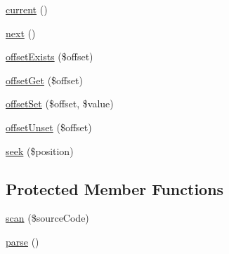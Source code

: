 \begin{DoxyCompactItemize}
\item 
\mbox{\hyperlink{class_p_h_p___token___stream_af343507d1926e6ecf964625d41db528c}{current}} ()
\item 
\mbox{\hyperlink{class_p_h_p___token___stream_acea62048bfee7b3cd80ed446c86fb78a}{next}} ()
\item 
\mbox{\hyperlink{class_p_h_p___token___stream_a24ff257ec0c2221bc6fd7b1b4388e26e}{offset\+Exists}} (\$offset)
\item 
\mbox{\hyperlink{class_p_h_p___token___stream_a59aee6e89465b48f014699f41b521f87}{offset\+Get}} (\$offset)
\item 
\mbox{\hyperlink{class_p_h_p___token___stream_ac6bde6b1eb50eb5377e91771fe46b7a3}{offset\+Set}} (\$offset, \$value)
\item 
\mbox{\hyperlink{class_p_h_p___token___stream_a2411227ea7118b13495de9839fd4b563}{offset\+Unset}} (\$offset)
\item 
\mbox{\hyperlink{class_p_h_p___token___stream_a94de197725a8af880010c507aa04ae94}{seek}} (\$position)
\end{DoxyCompactItemize}
\subsection*{Protected Member Functions}
\begin{DoxyCompactItemize}
\item 
\mbox{\hyperlink{class_p_h_p___token___stream_af7695cd79399ee0a062365e5bb77491b}{scan}} (\$source\+Code)
\item 
\mbox{\hyperlink{class_p_h_p___token___stream_a38d99acc70a1d8fd8f94455743b2d237}{parse}} ()
\end{DoxyCompactItemize}
